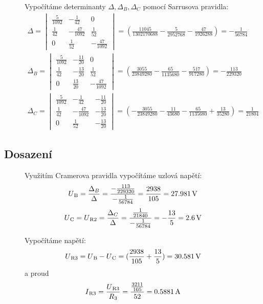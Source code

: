 \begin{figure}[H]
Vypočítáme determinanty $\Delta, \Delta_B, \Delta_C$ pomocí Sarrusova pravidla:
\begin{gather*}
    \Delta = 
    \begin{vmatrix}
    \frac{5}{1092}&-\frac{1}{42}&0 \\[5pt]
    \frac{1}{42}&-\frac{47}{1092}&\frac{1}{52} \\[5pt]
    0&\frac{1}{52}&-\frac{47}{1092}
    \end{vmatrix} = 
    (\frac{11045}{1302170688} - \frac{5}{2952768} - \frac{47}{1926288}) = -\frac{1}{56784}
\end{gather*}
\begin{gather*}
    \Delta_B = 
    \begin{vmatrix}
    \frac{5}{1092}&-\frac{11}{20}&0 \\[5pt]
    \frac{1}{42}&-\frac{13}{20}&\frac{1}{52} \\[5pt]
    0&\frac{13}{20}&-\frac{47}{1092} 
    \end{vmatrix} = 
    (\frac{3055}{23849280} - \frac{65}{1135680} - \frac{517}{917280}) = -\frac{113}{229320}
\end{gather*}
\begin{gather*}
    \Delta_C = 
    \begin{vmatrix}
    \frac{5}{1092}&-\frac{1}{42}&-\frac{11}{20} \\[5pt]
    \frac{1}{42}&-\frac{47}{1092}&-\frac{13}{20} \\[5pt]
    0&\frac{1}{52}&-\frac{13}{20} 
    \end{vmatrix} = 
    (-\frac{3055}{23849280} - \frac{11}{43680} - \frac{65}{1135680} + \frac{13}{35280}) = \frac{1}{21804}
\end{gather*}
\end{figure}

\subsection{Dosazení}
\begin{figure}[H]
Využitím Cramerova pravidla vypočítáme uzlová napětí:
$$U\textsubscript{B} = \frac{\Delta_B}{\Delta} = \frac{-\frac{113}{229320}}{-\frac{1}{56784}} = \frac{2938}{105} = \SI{27.981}{\volt}$$
$$U\textsubscript{C} = U\textsubscript{R2} = \frac{\Delta_C}{\Delta} = \frac{\frac{1}{21840}}{-\frac{1}{56784}} = -\frac{13}{5} = \SI{2.6}{\volt}$$

Vypočítáme napětí:
$$U\textsubscript{R3} = U\textsubscript{B} - U\textsubscript{C} = (\frac{2938}{105} + \frac{13}{5}) = \SI{30.581}{\volt}$$
a proud
$$I\textsubscript{R3} = \frac{U\textsubscript{R3}}{R\textsubscript{3}} = \frac{\frac{3211}{105}}{52} = \SI{0.5881}{\ampere}$$
\end{figure}
